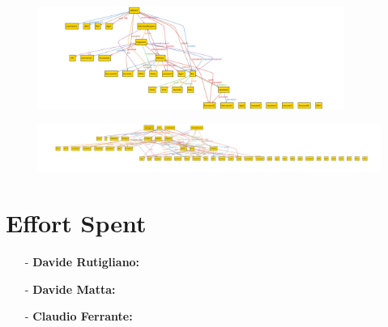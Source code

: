 \documentclass[a4paper]{article}
\begin{document}

\newpage
\begin{figure}[!htpb]
	\centering
	\includegraphics[width=100mm]{images/alloy/Track4RunComplete.png}
\end{figure}


\newpage
\begin{figure}[!htpb]
	\centering
	\includegraphics[width=200mm, angle = 90]{images/alloy/TrackMeComplete.png}
\end{figure}
\newpage
\section{Effort Spent}
    \begin{itemize}
        \item[-] \textbf{Davide Rutigliano:}
        
        \item[-] \textbf{Davide Matta:}
        
        \item[-] \textbf{Claudio Ferrante:}
    \end{itemize}
\end{document}
